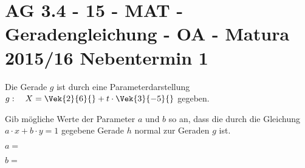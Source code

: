 \section{AG 3.4 - 15 - MAT - Geradengleichung - OA - Matura 2015/16 Nebentermin 1}

\begin{beispiel}[AG 3.4]{1} %
Die Gerade $g$ ist durch eine Parameterdarstellung $g:\quad X=\Vek{2}{6}{}+t\cdot \Vek{3}{-5}{}$ gegeben. \leer

Gib mögliche Werte der Parameter $a$ und $b$ so an, dass die durch die Gleichung $a\cdot x+b\cdot y=1$ gegebene Gerade $h$ normal zur Geraden $g$ ist. \leer

$a=$ 

$b=$ 
\end{beispiel}